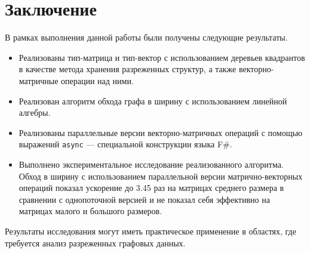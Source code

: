 
\section*{Заключение}

В рамках выполнения данной работы были получены следующие результаты.

\begin{itemize}
\item Реализованы тип-матрица и тип-вектор с использованием деревьев квадрантов в качестве метода хранения разреженных структур, а также векторно-матричные операции над ними.
\item Реализован алгоритм обхода графа в ширину с использованием линейной алгебры.
\item Реализованы параллельные версии векторно-матричных операций с помощью выражений \texttt{async} --- специальной конструкции языка F\#.
\item Выполнено экспериментальное исследование реализованного алгоритма. Обход в ширину с использованием параллельной версии матрично-векторных операций показал ускорение до 3.45 раз на матрицах среднего размера в сравнении с однопоточной версией и не показал себя эффективно на матрицах малого и большого размеров.
\end{itemize}

Результаты исследования могут иметь практическое применение в областях, где требуется анализ разреженных графовых данных. 